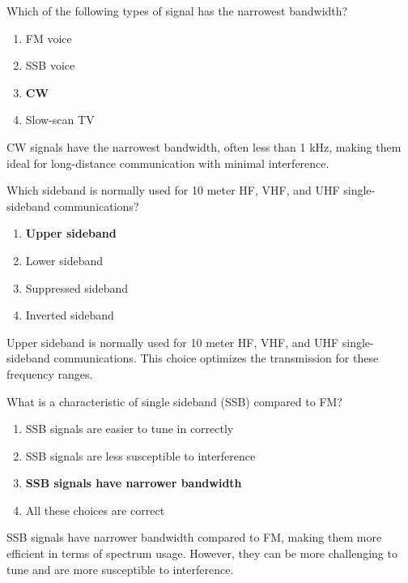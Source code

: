 
\begin{tcolorbox}[colback=gray!10!white,colframe=black!75!black,title={T8A05}]
    Which of the following types of signal has the narrowest bandwidth?
    \begin{enumerate}[label=\Alph*,noitemsep]
        \item FM voice
        \item SSB voice
        \item \textbf{CW}
        \item Slow-scan TV
    \end{enumerate}
\end{tcolorbox}
CW signals have the narrowest bandwidth, often less than 1 kHz, making them ideal for long-distance communication with minimal interference.


\begin{tcolorbox}[colback=gray!10!white,colframe=black!75!black,title={T8A06}]
    Which sideband is normally used for 10 meter HF, VHF, and UHF single-sideband communications?
    \begin{enumerate}[label=\Alph*,noitemsep]
        \item \textbf{Upper sideband}
        \item Lower sideband
        \item Suppressed sideband
        \item Inverted sideband
    \end{enumerate}
\end{tcolorbox}
Upper sideband is normally used for 10 meter HF, VHF, and UHF single-sideband communications. This choice optimizes the transmission for these frequency ranges.


\begin{tcolorbox}[colback=gray!10!white,colframe=black!75!black,title={T8A07}]
    What is a characteristic of single sideband (SSB) compared to FM?
    \begin{enumerate}[label=\Alph*,noitemsep]
        \item SSB signals are easier to tune in correctly
        \item SSB signals are less susceptible to interference
        \item \textbf{SSB signals have narrower bandwidth}
        \item All these choices are correct
    \end{enumerate}
\end{tcolorbox}
SSB signals have narrower bandwidth compared to FM, making them more efficient in terms of spectrum usage. However, they can be more challenging to tune and are more susceptible to interference.

